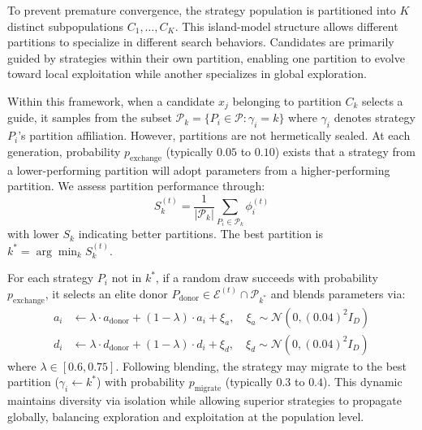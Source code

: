 \documentclass[11pt]{article}
\begin{document}
To prevent premature convergence, the strategy population is partitioned into $K$ distinct subpopulations $C_1, \ldots, C_K$. This island-model structure allows different partitions to specialize in different search behaviors. Candidates are primarily guided by strategies within their own partition, enabling one partition to evolve toward local exploitation while another specializes in global exploration.

Within this framework, when a candidate $x_j$ belonging to partition $C_k$ selects a guide, it samples from the subset $\mathcal{P}_k = \{P_i \in \mathcal{P} : \gamma_i = k\}$ where $\gamma_i$ denotes strategy $P_i$'s partition affiliation. However, partitions are not hermetically sealed. At each generation, probability $p_{\text{exchange}}$ (typically $0.05$ to $0.10$) exists that a strategy from a lower-performing partition will adopt parameters from a higher-performing partition. We assess partition performance through:
\begin{equation}
S_k^{(t)} = \frac{1}{|\mathcal{P}_k|} \sum_{P_i \in \mathcal{P}_k} \phi_i^{(t)}
\label{eq:partition_strength}
\end{equation}
with lower $S_k$ indicating better partitions. The best partition is $k^* = \arg\min_k S_k^{(t)}$.

For each strategy $P_i$ not in $k^*$, if a random draw succeeds with probability $p_{\text{exchange}}$, it selects an elite donor $P_{\text{donor}} \in \mathcal{E}^{(t)} \cap \mathcal{P}_{k^*}$ and blends parameters via:
\begin{align}
a_i &\leftarrow \lambda \cdot a_{\text{donor}} + (1-\lambda) \cdot a_i + \xi_a, \quad \xi_a \sim \mathcal{N}(0, (0.04)^2 I_D) \\
d_i &\leftarrow \lambda \cdot d_{\text{donor}} + (1-\lambda) \cdot d_i + \xi_d, \quad \xi_d \sim \mathcal{N}(0, (0.04)^2 I_D)
\end{align}
where $\lambda \in [0.6, 0.75]$. Following blending, the strategy may migrate to the best partition ($\gamma_i \leftarrow k^*$) with probability $p_{\text{migrate}}$ (typically $0.3$ to $0.4$). This dynamic maintains diversity via isolation while allowing superior strategies to propagate globally, balancing exploration and exploitation at the population level.
\end{document}

